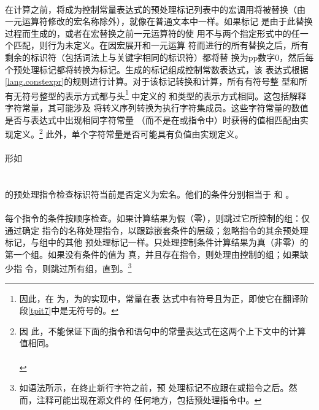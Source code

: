 {\paragraph{}
在计算之前，将成为控制常量表达式的预处理标记列表中的宏调用将被替换（由
一元运算符修改的宏名称除外），就像在普通文本中一样。如果标记
是由于此替换过程而生成的，或者在宏替换之前一元运算符的使
用不与两个指定形式中的任一个匹配，则行为未定义。在因宏展开和一元运算
符而进行的所有替换之后，所有剩余的标识符（包括词法上与关键字相同的标识符）都将替
换为pp数字0，然后每个预处理标记都将转换为标记。生成的标记组成控制常数表达式，该
表达式根据\ref{lang.constexpr}的规则进行计算。对于该标记转换和计算，所有有符号整
型和所有无符号整型的表示方式都与头\footnote{因此，在
为，为的实现中，常量在表
达式中有符号且为正，即使它在翻译阶段\ref{tpit7}中是无符号的。} 中定义的
和类型的表示方式相同。这包括解释字符常量，其可能涉及
将转义序列转换为执行字符集成员。这些字符常量的数值是否与表达式中出现相同字符常量
（而不是在或指令中）时获得的值相匹配由实现定义。\footnote{因
此，不能保证下面的指令和语句中的常量表达式在这两个上下文中的计算
值相同。                                                                      \\
\mbox{\hspace{4em}}                                  \\
\mbox{\hspace{4em}}
} 此外，单个字符常量是否可能具有负值由实现定义。

\paragraph{}
形如                                                                          \\
\mbox{} \\
\mbox{}  \\
的预处理指令检查标识符当前是否定义为宏名。他们的条件分别相当于
和 。

\paragraph{}
每个指令的条件按顺序检查。如果计算结果为假（零），则跳过它所控制的组：仅通过确定
指令的名称处理指令，以跟踪嵌套条件的层级；忽略指令的其余预处理标记，与组中的其他
预处理标记一样。只处理控制条件计算结果为真（非零）的第一个组。如果没有条件的值为
真，并且存在指令，则处理由控制的组；如果缺少指
令，则跳过所有组，直到。\footnote{如语法所示，在终止新行字符之前，预
处理标记不应跟在或指令之后。然而，注释可能出现在源文件的
任何地方，包括预处理指令中。}

}
